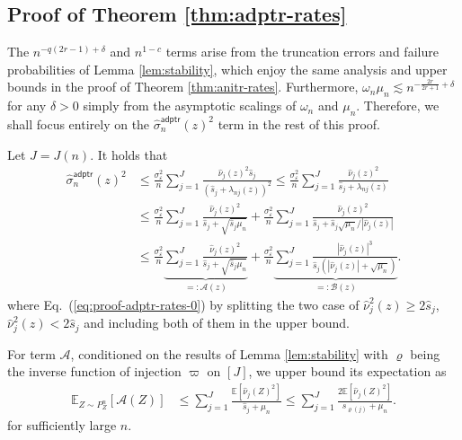 \documentclass[aos]{imsart}
\renewcommand{\hat}{\widehat}
\newcommand{\mA}{\mathcal A}
\newcommand{\mB}{\mathcal B}
\newcommand{\adptr}{\mathsf{adptr}}
\newcommand{\pd}[1]{%
	{ \color{blue} PD: #1}%
}
\theoremstyle{plain}
\theoremstyle{definition}
\theoremstyle{definition}
\begin{document}
\begin{appendix}



\subsection{Proof of Theorem \ref{thm:adptr-rates}}

The $n^{-q(2r-1)+\delta}$ and $n^{1-c}$ terms arise from the truncation errors and failure probabilities of Lemma \ref{lem:stability}, which enjoy the same analysis and upper bounds
in the proof of Theorem \ref{thm:anitr-rates}.
Furthermore, $\omega_n\mu_n\lesssim n^{-\frac{2r}{2r+1}+\delta}$ for any $\delta>0$ simply from the asymptotic scalings of $\omega_n$ and $\mu_n$.
Therefore, we shall focus entirely on the $\hat\sigma_n^\adptr(z)^2$ term in the rest of this proof.

Let $J=J(n)$.
It holds that
\begin{align}
\hat\sigma_n^\adptr(z)^2 &\leq \frac{\sigma_\varepsilon^2}{n}\sum_{j=1}^J\frac{\hat\nu_j(z)^2\hat s_j}{(\hat s_j+\lambda_{nj}(z))^2} \leq \frac{\sigma_\varepsilon^2}{n}\sum_{j=1}^J\frac{\hat\nu_j(z)^2}{\hat s_j+\lambda_{nj}(z)}\nonumber\\
&\leq \frac{\sigma_\varepsilon^2}{n}\sum_{j=1}^J\frac{\hat\nu_j(z)^2}{\hat s_j+\sqrt{\hat s_j\mu_n}} + \frac{\sigma_\varepsilon^2}{n}\sum_{j=1}^J\frac{\hat\nu_j(z)^2}{\hat s_j+\hat s_j\sqrt{\mu_n}/|\hat\nu_j(z)|} \label{eq:proof-adptr-rates-0}\\
&\leq  \frac{\sigma_\varepsilon^2}{n}\underbrace{\sum_{j=1}^J\frac{\hat\nu_j(z)^2}{\hat s_j+\sqrt{\hat s_j\mu_n}}}_{=:\mA(z)} + \frac{\sigma_\varepsilon^2}{n}\underbrace{\sum_{j=1}^J\frac{|\hat\nu_j(z)|^3}{\hat s_j(|\hat\nu_j(z)|+\sqrt{\mu_n})}}_{=:\mB(z)}.
\label{eq:proof-adptr-rates-1}
\end{align}
where Eq.~(\ref{eq:proof-adptr-rates-0}) by splitting the two case of $\hat\nu_j^2(z) \geq 2\hat s_j$, $\hat\nu_j^2(z) <2\hat s_j$ and including both of them in the upper bound.

For term $\mA$, conditioned on the results of Lemma \ref{lem:stability} with $\varrho$ being the inverse function of injection $\varpi$ on $[J]$, we upper bound its expectation as
{\color{magenta}
\begin{align}
\mathbb E_{Z\sim P_Z^n}[\mA(Z)] &\leq \sum_{j=1}^J \frac{\mathbb E[\hat\nu_j(Z)^2]}{\hat s_j + \mu_n} \leq \sum_{j=1}^J\frac{2\mathbb E[\hat\nu_j(Z)^2]}{s_{\varrho(j)}+\mu_n}.\label{eq:proof-adptr-sp1}
\end{align}
for sufficiently large $n$.
}


\end{appendix}
\end{document}

